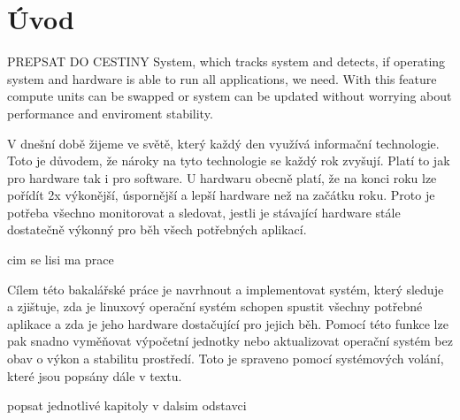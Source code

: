 \chapter{Úvod}

PREPSAT DO CESTINY
System, which tracks system and detects, if operating system and hardware is able to run all
applications, we need. With this feature compute units can be swapped or system can be updated
without worrying about performance and enviroment stability.

V dnešní době žijeme ve světě, který každý den využívá informační technologie. Toto je důvodem, že nároky na tyto technologie se
každý rok zvyšují. Platí to jak pro hardware tak i pro software. U hardwaru obecně platí, že na konci roku lze pořídít 2x výkonější,
úspornější a lepší hardware než na začátku roku. Proto je potřeba všechno monitorovat a sledovat, jestli je stávající hardware stále
dostatečně výkonný pro běh všech potřebných aplikací.

cim se lisi ma prace

Cílem této bakalářské práce je navrhnout a implementovat systém, který sleduje a zjištuje, zda je linuxový operační systém schopen spustit
všechny potřebné aplikace a zda je jeho hardware dostačující pro jejich běh. Pomocí této funkce lze pak snadno vyměňovat výpočetní jednotky
nebo aktualizovat operační systém bez obav o výkon a stabilitu prostředí. Toto je spraveno pomocí systémových volání, které jsou popsány dále
v textu.

popsat jednotlivé kapitoly v dalsim odstavci